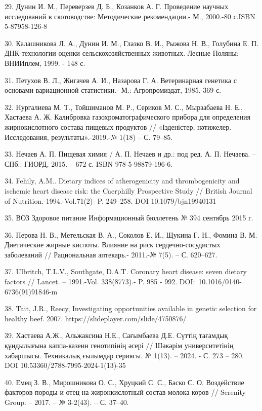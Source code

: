 29. Дунин И. М., Переверзев Д. Б., Козанков А. Г. Проведение научных
исследований в скотоводстве: Методические рекомендации.- М., 2000.-80
с.ISBN 5-87958-126-8

30. Калашникова Л. А., Дунин И. М., Глазко В. И., Рыжова Н. В., Голубина
Е. П. ДНК-технологии оценки сельскохозяйственных животных.-Лесные
Поляны: ВНИИплем, 1999. - 148 с.

31. Петухов В. Л., Жигачев А. И., Назарова Г. А. Ветеринарная генетика с
основами вариационной статистики.- М.: Агропромиздат, 1985.-369 с.

32. Нургалиева М. Т., Тойшиманов М. Р., Сериков М. С., Мырзабаева Н. Е.,
Хастаева А. Ж. Калибровка газохроматографического прибора для
определения жирнокислотного состава пищевых продуктов // «Ізденістер,
нәтижелер. Исследования, результаты».-2019.-№ 1(18) -- С. 79--85.

33. Нечаев А. П. Пищевая химия / А. П. Нечаев и др.: под ред. А. П.
Нечаева. -- СПб.: ГИОРД, 2015. -- 672 с. ISBN 978-5-98879-196-6.

34. Fehily, A.M.. Dietary indices of atherogenicity and thrombogenicity
and ischemic heart disease risk: the Caerphilly Prospective Study //
British Journal of Nutrition.-1994.-Vol.71(2)- P. 249--258. DOI
10.1079/bjn19940131

35. ВОЗ Здоровое питание Информационный бюллетень № 394 сентябрь 2015 г.

36. Перова Н. В., Метельская В. А., Соколов Е. И., Щукина Г. Н., Фомина
В. М. Диетические жирные кислоты. Влияние на риск сердечно-сосудистых
заболеваний // Рациональная аптекарь.- 2011.-№ 7(5). -- С. 620--627.

37. Ulbritch, T.L.V., Southgate, D.A.T. Coronary heart disease: seven
dietary factors // Lancet. -- 1991.-Vol. 338(8773).- P. 985 - 992.
DOI:~10.1016/0140-6736(91)91846-m

38. Tait, J.R., Reecy, Investigating opportunities available in genetic
selection for healthy beef. 2007. https://slideplayer.com/slide/4750876/

39. Хастаева А.Ж., Альжаксина Н.Е., Сағымбаева Д.Е. Сүттің тағамдық
құндылығына каппа-казеин генотипінің әсері // Шәкәрім университетінің
хабаршысы. Техникалық ғылымдар сериясы. № 1(13). -- 2024. - С. 273 --
280. DOI 10.53360/2788-7995-2024-1(13)-35

40. Емец З. В., Мирошникова О. С., Хруцкий С. С., Баско С. О.
Воздействие факторов породы и отец на жиронкислотный состав молока коров
// Serenity -- Group. -- 2017. -- № 3-2(43). -- С. 37--40.

